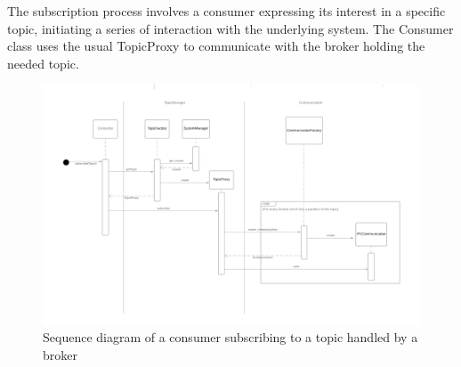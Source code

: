 The subscription process involves a consumer expressing its interest in a
specific topic, initiating a series of interaction with the underlying system.
The Consumer class uses the usual TopicProxy to communicate with the broker
holding the needed topic.

\begin{figure}[H]
    \centering
    \includegraphics[width=1.0\textwidth]{Figures/sequence_diagram_subscription.png}
    \caption{Sequence diagram of a consumer subscribing to a topic handled by
             a broker}
\end{figure}

